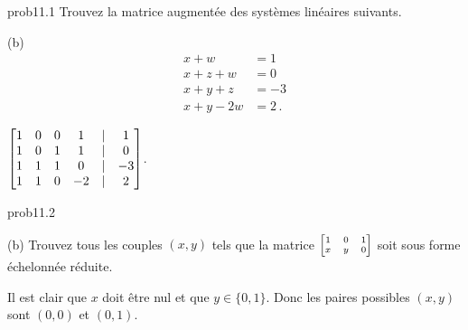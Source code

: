 
\begin{sol}{prob11.1} Trouvez la matrice augmentée des systèmes linéaires suivants.
\medskip

(b) \begin{align*}
 x+w&=1\\
x+z+w&=0\\
x+y+z&=-3\\
x+y-2w&=2\,.
\end{align*}
\medskip

\soln $ 
\bmatrix 
1 & 0 & 0 & 1&|&1 \\
1 & 0 & 1 & 1&|&0 \\
1 & 1 & 1 & 0&|&-3 \\
1 & 1 & 0 & -2&|&2\endbmatrix$.
  
\medskip

\end{sol}

\bigskip
\begin{sol}{prob11.2}
\medskip

(b) Trouvez tous les couples $(x,y)$ tels que la matrice $\scriptsize\bmatrix 1&0&1\cr
x&y&0\endbmatrix$ soit sous forme échelonnée réduite.
\medskip

\soln Il est clair que $x$ doit être nul et que $y\in\{0,1\}$. Donc les paires possibles $(x,y)$ sont $(0,0)$ et $(0,1)$.
\medskip
 


\end{sol}